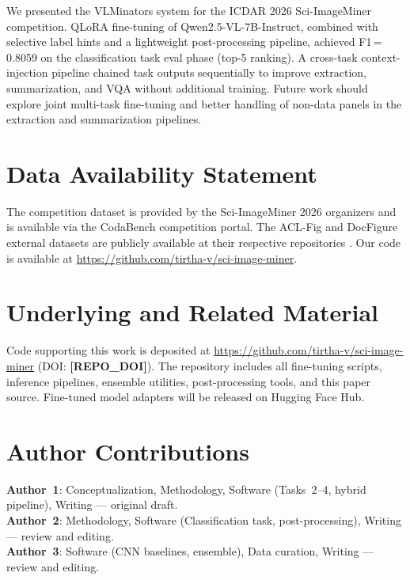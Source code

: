 \documentclass[11pt]{tibop-article}
\newcommand{\FILL}[1]{\textbf{[#1]}}
\begin{document}
We presented the VLMinators system for the ICDAR 2026 Sci-ImageMiner competition.
QLoRA fine-tuning of Qwen2.5-VL-7B-Instruct, combined with selective label
hints and a lightweight post-processing pipeline, achieved F1\,=\,0.8059 on
the classification task eval phase (top-5 ranking).
A cross-task context-injection pipeline chained task outputs sequentially to
improve extraction, summarization, and VQA without additional training.
Future work should explore joint multi-task fine-tuning and better handling of
non-data panels in the extraction and summarization pipelines.


\section*{Data Availability Statement}

The competition dataset is provided by the Sci-ImageMiner 2026 organizers and
is available via the CodaBench competition portal.
The ACL-Fig and DocFigure external datasets are publicly available at their
respective repositories \cite{aclfig,docfigure}.
Our code is available at \url{https://github.com/tirtha-v/sci-image-miner}.

\section*{Underlying and Related Material}

Code supporting this work is deposited at
\url{https://github.com/tirtha-v/sci-image-miner} (DOI: \FILL{REPO\_DOI}).
The repository includes all fine-tuning scripts, inference pipelines,
ensemble utilities, post-processing tools, and this paper source.
Fine-tuned model adapters will be released on Hugging Face Hub.

\section*{Author Contributions}

\textbf{Author~1}: Conceptualization, Methodology, Software (Tasks~2--4,
  hybrid pipeline), Writing --- original draft.\\
\textbf{Author~2}: Methodology, Software (Classification task, post-processing),
  Writing --- review and editing.\\
\textbf{Author~3}: Software (CNN baselines, ensemble), Data curation,
  Writing --- review and editing.
\end{document}
